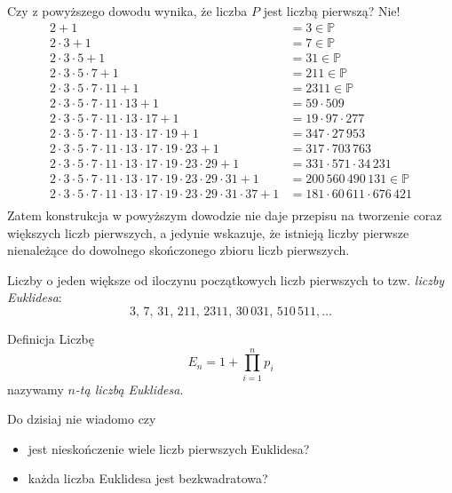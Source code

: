 \documentclass[a4paper,10pt]{beamer}
\begin{document}
\begin{frame}
	Czy z powyższego dowodu wynika, że liczba $P$ jest liczbą pierwszą? Nie!
	\begin{align*}
2+1&=3\in\mathbb{P}\\
2\cdot3+1&=7\in\mathbb{P}\\
2\cdot3\cdot5+1&=31\in\mathbb{P}\\
2\cdot3\cdot5\cdot7+1&=211\in\mathbb{P}\\
2\cdot3\cdot5\cdot7\cdot11+1&=2311\in\mathbb{P}\\
2\cdot3\cdot5\cdot7\cdot11\cdot13+1&=59\cdot509\\
2\cdot3\cdot5\cdot7\cdot11\cdot13\cdot17+1&=19\cdot97\cdot277\\
2\cdot3\cdot5\cdot7\cdot11\cdot13\cdot17\cdot19+1&=347\cdot27\,953\\
2\cdot3\cdot5\cdot7\cdot11\cdot13\cdot17\cdot19\cdot23+1&=317\cdot703\,763\\
2\cdot3\cdot5\cdot7\cdot11\cdot13\cdot17\cdot19\cdot23\cdot29+1&=331\cdot571\cdot34\,231\\
2\cdot3\cdot5\cdot7\cdot11\cdot13\cdot17\cdot19\cdot23\cdot29\cdot31+1&=200\,560\,490\,131\in\mathbb{P}\\
2\cdot3\cdot5\cdot7\cdot11\cdot13\cdot17\cdot19\cdot23\cdot29\cdot31\cdot37+1&=181\cdot60\,611\cdot676\,421\\
	\end{align*}
	Zatem konstrukcja w powyższym dowodzie nie daje przepisu na tworzenie coraz większych liczb pierwszych, a jedynie wskazuje, że istnieją liczby pierwsze nienależące do dowolnego skończonego zbioru liczb pierwszych.
\end{frame}
	
\begin{frame}
Liczby o jeden większe od iloczynu początkowych liczb pierwszych to tzw. {\it liczby Euklidesa}:
$$3,\,7,\,31,\,211,\,2311,\,30\,031,\,510\,511,\ldots$$

\begin{block}{Definicja}
Liczbę $$E_n=1+\prod\limits_{i=1}^np_i$$ nazywamy {\it $n$-tą liczbą Euklidesa}.
\end{block}

\bigskip

\begin{block}{}
Do dzisiaj nie wiadomo czy
\begin{itemize}
\item jest nieskończenie wiele liczb pierwszych Euklidesa?
\item każda liczba Euklidesa jest bezkwadratowa?
\end{itemize}
\end{block}
\end{frame}
\end{document}
